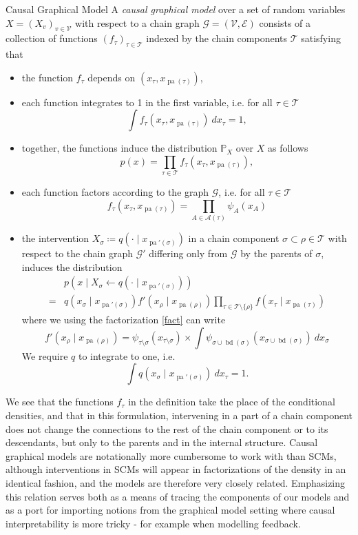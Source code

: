 \documentclass[11pt, a4paper]{memoir}
\theoremstyle{break}
\theoremstyle{break}
\theoremstyle{nonumberplain}
\newcommand{\mP}{\mathbb{P}}
\DeclareMathOperator{\pa}{pa}
\DeclareMathOperator{\bd}{bd}
\begin{document}
\begin{mydefinition}{Causal Graphical Model}
A \emph{causal graphical model} over a set of random variables $X=(X_v)_{v\in \mathcal{V}}$ with respect to a chain graph $\mathcal{G}=(\mathcal{V},\mathcal{E})$ consists of a collection of functions $(f_\tau)_{\tau\in \mathscr{T}}$ indexed by the chain components $\mathscr{T}$ satisfying that
\begin{itemize}
	\item the function $f_\tau$ depends on $\left(x_\tau,x_{\pa(\tau)}\right)$,
	\item each function integrates to 1 in the first variable, i.e. for all $\tau\in \mathscr{T}$
	$$\int f_\tau\left(x_\tau,x_{\pa(\tau)}\right)\ dx_\tau=1,$$
	\item together, the functions induce the distribution $\mP_X$ over $X$ as follows
	$$p(x)=\prod_{\tau\in \mathscr{T}} f_ \tau\left(x_\tau,x_{\pa(\tau)}\right),$$
	\item each function factors according to the graph $\mathcal{G}$, i.e. for all $\tau\in \mathscr{T}$
	$$f_\tau\left(x_\tau,x_{\pa(\tau)}\right)=\prod_{A\in \mathscr{A}(\tau)}\psi_A(x_A)$$
	\item the intervention $X_\sigma\coloneqq q\left(\cdot \mid x_{\pa'(\sigma)}\right)$ in a chain component $\sigma\subset\rho\in \mathscr{T} $ with respect to the chain graph $\mathcal{G}'$ differing only from $\mathcal{G}$ by the parents of $\sigma$, induces the distribution
	\begin{align*}
	&p\left(x \mid X_\sigma\gets q\left(\cdot \mid x_{\pa'(\sigma)}\right)\right)\\
	=&q\left(x_\sigma \mid x_{\pa'(\sigma)}\right)f'\left(x_{\rho}\mid x_{\pa(\rho)}\right)\prod_{\tau\in \mathscr{T}\setminus\{\rho\}} f\left(x_\tau\mid x_{\pa(\tau)}\right)
	\end{align*}
	where we using the factorization \ref{fact} can write
	$$f'\left(x_{\rho}\mid x_{\pa(\rho)}\right)=\psi_{\tau\setminus\sigma}\left(x_{\tau\setminus \sigma}\right)\times \int \psi_{\sigma\cup\bd(\sigma)}\left(x_{\sigma\cup\bd(\sigma)}\right)\ dx_\sigma$$
	We require $q$ to integrate to one, i.e.
	$$\int q\left(x_\sigma\mid x_{\pa'(\sigma)}\right)\ dx_\tau=1.$$
\end{itemize}
\end{mydefinition}
We see that the functions $f_\tau$ in the definition take the place of the conditional densities, and that in this formulation, intervening in a part of a chain component does not change the connections to the rest of the chain component or to its descendants, but only to the parents and in the internal structure. Causal graphical models are notationally more cumbersome to work with than SCMs, although interventions in SCMs will appear in factorizations of the density in an identical fashion, and the models are therefore very closely related.  Emphasizing this relation serves both as a means of tracing the components of our models and as a port for importing notions from the graphical model setting where causal interpretability is more tricky - for example when modelling feedback.\\\\
\end{document}
